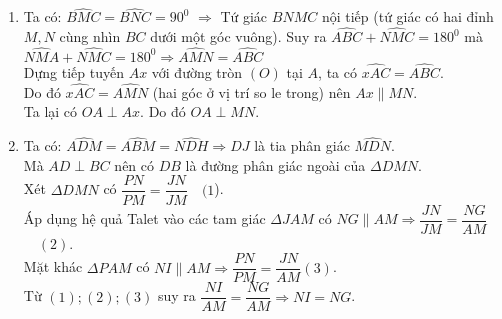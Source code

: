 \begin{ex}
{\begin{enumerate}
        $\Rightarrow AM.AC{\rm{ }} = {\rm{ }}AN.AB$
        \item Ta có: $\widehat {BMC} = \widehat {BNC} = {90}^0$
        $\Rightarrow$ Tứ giác $BNMC$ nội tiếp (tứ giác có hai đỉnh $M,N$ cùng nhìn $BC$ dưới một góc vuông). Suy ra $\widehat {ABC} + \widehat {NMC} = {180^0}$ mà $\widehat {NMA} + \widehat {NMC} = {180^0}\Rightarrow\widehat {AMN} = \widehat {ABC}$\\
        Dựng tiếp tuyến $Ax$ với đường tròn $(O)$ tại $A$, ta có $\widehat {xAC} = \widehat {ABC}$.\\
        Do đó $\widehat {xAC} = \widehat {AMN}$ (hai góc ở vị trí so le trong) nên $Ax\parallel MN$.\\
        Ta lại có $OA\perp Ax$. Do đó $OA\perp MN$.
         \item Ta có: $\widehat {ADM} = \widehat {ABM} = \widehat {NDH} \Rightarrow DJ$ là tia phân giác $\widehat {MDN}$.\\
             Mà $AD\perp BC$ nên có $DB$ là đường phân giác ngoài của $\Delta DMN$.\\
             Xét $\Delta DMN$ có $\dfrac{PN}{PM}=\dfrac{JN}{JM}$~~$(1$).\\
             Áp dụng hệ quả Talet vào các tam giác $\Delta JAM $ có $NG\parallel AM \Rightarrow \dfrac{JN}{JM}=\dfrac{NG}{AM}$ ~~$(2)$.\\
             Mặt khác $\Delta PAM$ có $NI\parallel AM\Rightarrow \dfrac{PN}{PM}=\dfrac{JN}{AM}$$(3)$.\\
             Từ $(1);(2);(3)$ suy ra $\dfrac{NI}{AM}=\dfrac{NG}{AM}\Rightarrow NI=NG$.
            \end{enumerate}
    }
\end{ex}

